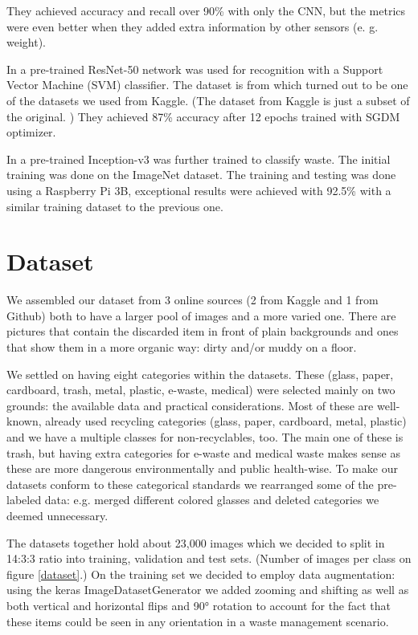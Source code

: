 \documentclass[twocolumn]{article}
\begin{document}
	They achieved accuracy and recall over 90\% with only the CNN, but the metrics were even better when they added extra information by other sensors (e. g. weight).
	
	In \cite{ADEDEJI2019607} a pre-trained ResNet-50 \cite{DBLP:journals/corr/HeZRS15}
	network was used for recognition with a Support Vector Machine (SVM) classifier. The dataset is from \cite{yang2016classification} which turned out to be one of the datasets we used from Kaggle. (The dataset from Kaggle is just a subset of the original. \cite{cchangcs_2018}) They achieved 87\% accuracy after 12 epochs trained with SGDM optimizer.
	
	In \cite{10.1145/3417473.3417474} a pre-trained Inception-v3 was further trained to classify waste. The initial training was done on the ImageNet \cite{5206848} dataset. The training and testing was done using a Raspberry Pi 3B, exceptional results were achieved with 92.5\% with a similar training dataset to the previous one.
	
	\section{Dataset}
	We assembled our dataset from 3 online sources (2 from Kaggle and 1 from Github) both to have a larger pool of images and a more varied one. There are pictures that contain the discarded item in front of plain backgrounds and ones that show them in a more organic way: dirty and/or muddy on a floor. 
	
	We settled on having eight categories within the datasets. These (glass, paper, cardboard, trash, metal, plastic, e-waste, medical) were selected mainly on two grounds: the available data and practical considerations. Most of these are well-known, already used recycling categories (glass, paper, cardboard, metal, plastic) and we have a multiple classes for non-recyclables, too. The main one of these is trash, but having extra categories for e-waste and medical waste makes sense as these are more dangerous environmentally and public health-wise. To make our datasets conform to these categorical standards we rearranged some of the pre-labeled data: e.g. merged different colored glasses and deleted categories we deemed unnecessary.
	
	The datasets together hold about 23,000 images which we decided to split in 14:3:3 ratio into training, validation and test sets. (Number of images per class on figure \ref{dataset}.) On the training set we decided to employ data augmentation: using the keras ImageDatasetGenerator we added zooming and shifting as well as both vertical and horizontal flips and 90° rotation to account for the fact that these items could be seen in any orientation in a waste management scenario.
	
\end{document}
